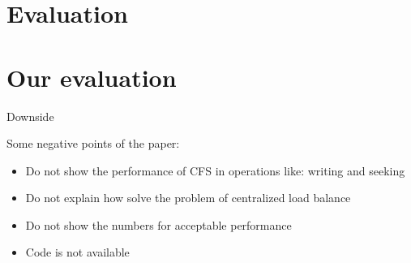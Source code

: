 \documentclass{beamer}
\begin{document}
\section{Evaluation}

	
	
\section{Our evaluation}

	\begin{frame}{Downside}

	Some negative points of the paper:
	\begin{itemize}
	\item Do not show the performance of CFS in operations like: writing and seeking
	\item Do not explain how solve the problem of centralized load balance
	\item Do not show the numbers for acceptable performance
	\item Code is not available
	\end{itemize}

	\end{frame}
\end{document}
